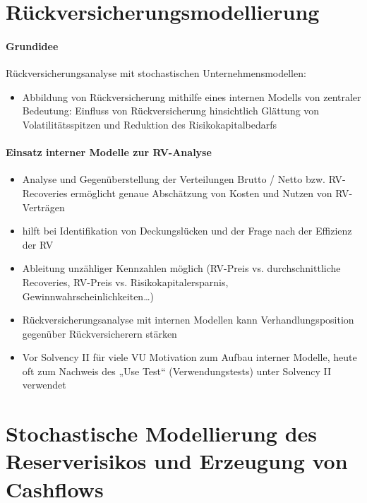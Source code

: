 \documentclass[12pt]{report}
\theoremstyle{dotless}
\theoremstyle{definition}
\begin{document}
\chapter{Rückversicherungsmodellierung}

\subsubsection{Grundidee}

Rückversicherungsanalyse mit stochastischen Unternehmensmodellen:
\begin{itemize}
\item Abbildung von Rückversicherung mithilfe eines internen Modells von zentraler Bedeutung: Einfluss von Rückversicherung hinsichtlich Glättung von Volatilitätsspitzen und Reduktion des Risikokapitalbedarfs
\end{itemize}

\subsubsection{Einsatz interner Modelle zur RV-Analyse}
\begin{itemize}
\item Analyse und Gegenüberstellung der Verteilungen Brutto / Netto bzw. RV-Recoveries ermöglicht genaue Abschätzung von Kosten und Nutzen von RV-Verträgen
\item hilft bei Identifikation von Deckungslücken und der Frage nach der Effizienz der RV
\item  Ableitung unzähliger Kennzahlen möglich (RV-Preis vs. durchschnittliche Recoveries, RV-Preis vs. Risikokapitalersparnis, Gewinnwahrscheinlichkeiten…)
\item Rückversicherungsanalyse mit internen Modellen kann Verhandlungsposition gegenüber Rückversicherern stärken
\item Vor Solvency II für viele VU Motivation zum Aufbau interner Modelle, heute oft zum
Nachweis des „Use Test“ (Verwendungstests) unter Solvency II verwendet
\end{itemize}

\chapter{Stochastische Modellierung des Reserverisikos und Erzeugung von Cashflows}
\end{document}

